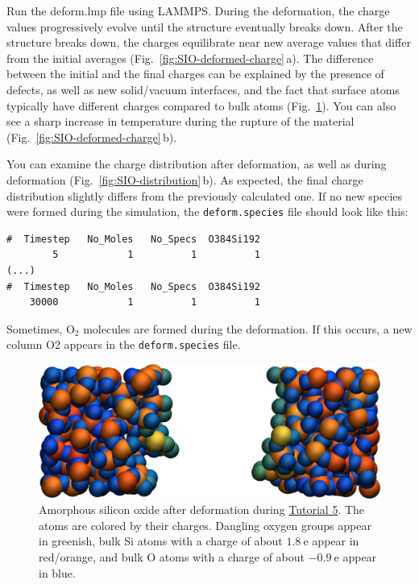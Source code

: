 \documentclass[9pt,tutorial]{livecoms}
\newcommand{\lmpcmd}[1]{\colorbox{listing}{\textcolor{command}{\small{#1}}}} %
\newcommand{\flecmd}[1]{\textcolor{command}{\texttt{#1}}} %
\begin{document}
Run the \lmpcmd{deform.lmp} file using LAMMPS.  During the deformation, the charge
values progressively evolve until the structure eventually breaks down.  After the
structure breaks down, the charges equilibrate near new average values that differ
from the initial averages (Fig.~\ref{fig:SIO-deformed-charge}\,a).  The difference
between the initial and the final charges can be explained by the presence of
defects, as well as new solid/vacuum interfaces, and the fact that surface atoms
typically have different charges compared to bulk atoms (Fig.~\ref{fig:SIO-deformed}).
You can also see a sharp increase in temperature during the rupture of
the material (Fig.~\ref{fig:SIO-deformed-charge}\,b).

You can examine the charge distribution after deformation, as well as during
deformation (Fig.~\ref{fig:SIO-distribution}\,b).  As expected, the final
charge distribution slightly differs from the previously calculated one.  If
no new species were formed during the simulation, the \flecmd{deform.species} file
should look like this:
\begin{lstlisting}
#  Timestep   No_Moles   No_Specs  O384Si192
        5            1          1          1
(...)
#  Timestep   No_Moles   No_Specs  O384Si192
    30000            1          1          1
\end{lstlisting}
Sometimes, $\text{O}_2$ molecules are formed during the deformation.  If this occurs,
a new column \lmpcmd{O2} appears in the \flecmd{deform.species} file.

\begin{figure}
\includegraphics[width=\linewidth]{SIO-deformed}
\caption{Amorphous silicon oxide after deformation during
\hyperref[reactive-silicon-dioxide-label]{Tutorial 5}.  The atoms are colored by their
charges.  Dangling oxygen groups appear in greenish, bulk Si atoms with a charge of
about $1.8~\text{e}$  appear in red/orange, and bulk O atoms with a charge of
about $-0.9 ~ \text{e}$ appear in blue.}
\label{fig:SIO-deformed}
\end{figure}
\end{document}
